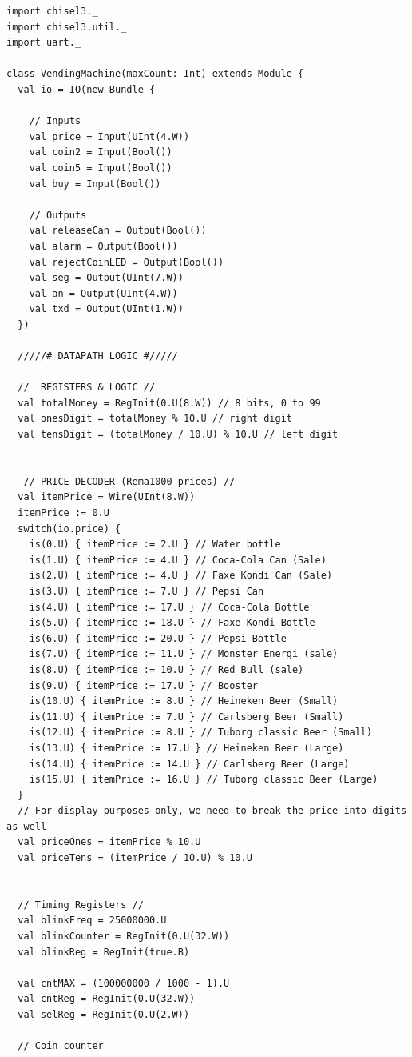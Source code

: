 \begin{lstlisting}
import chisel3._
import chisel3.util._
import uart._

class VendingMachine(maxCount: Int) extends Module {
  val io = IO(new Bundle {

    // Inputs
    val price = Input(UInt(4.W))
    val coin2 = Input(Bool())
    val coin5 = Input(Bool())
    val buy = Input(Bool())

    // Outputs
    val releaseCan = Output(Bool())
    val alarm = Output(Bool())
    val rejectCoinLED = Output(Bool())
    val seg = Output(UInt(7.W))
    val an = Output(UInt(4.W))
    val txd = Output(UInt(1.W))
  })

  /////# DATAPATH LOGIC #/////

  //  REGISTERS & LOGIC //
  val totalMoney = RegInit(0.U(8.W)) // 8 bits, 0 to 99
  val onesDigit = totalMoney % 10.U // right digit
  val tensDigit = (totalMoney / 10.U) % 10.U // left digit


   // PRICE DECODER (Rema1000 prices) //
  val itemPrice = Wire(UInt(8.W))
  itemPrice := 0.U
  switch(io.price) {
    is(0.U) { itemPrice := 2.U } // Water bottle
    is(1.U) { itemPrice := 4.U } // Coca-Cola Can (Sale)
    is(2.U) { itemPrice := 4.U } // Faxe Kondi Can (Sale) 
    is(3.U) { itemPrice := 7.U } // Pepsi Can
    is(4.U) { itemPrice := 17.U } // Coca-Cola Bottle
    is(5.U) { itemPrice := 18.U } // Faxe Kondi Bottle
    is(6.U) { itemPrice := 20.U } // Pepsi Bottle
    is(7.U) { itemPrice := 11.U } // Monster Energi (sale)
    is(8.U) { itemPrice := 10.U } // Red Bull (sale)
    is(9.U) { itemPrice := 17.U } // Booster
    is(10.U) { itemPrice := 8.U } // Heineken Beer (Small)
    is(11.U) { itemPrice := 7.U } // Carlsberg Beer (Small)
    is(12.U) { itemPrice := 8.U } // Tuborg classic Beer (Small)
    is(13.U) { itemPrice := 17.U } // Heineken Beer (Large)
    is(14.U) { itemPrice := 14.U } // Carlsberg Beer (Large)
    is(15.U) { itemPrice := 16.U } // Tuborg classic Beer (Large)
  }
  // For display purposes only, we need to break the price into digits as well
  val priceOnes = itemPrice % 10.U
  val priceTens = (itemPrice / 10.U) % 10.U


  // Timing Registers //
  val blinkFreq = 25000000.U
  val blinkCounter = RegInit(0.U(32.W))
  val blinkReg = RegInit(true.B)

  val cntMAX = (100000000 / 1000 - 1).U
  val cntReg = RegInit(0.U(32.W))
  val selReg = RegInit(0.U(2.W))

  // Coin counter


\end{lstlisting}

